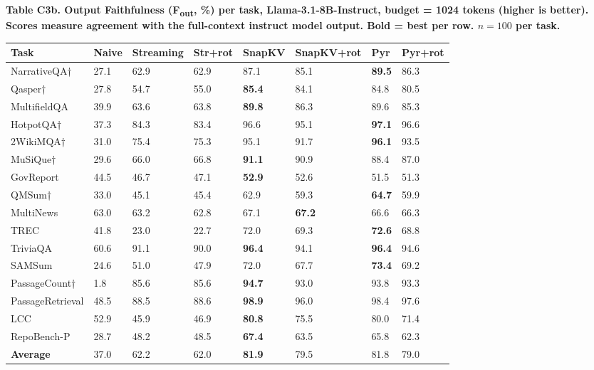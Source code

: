 \documentclass[10pt,letterpaper]{article}
\begin{document}
\textbf{Table C3b. Output Faithfulness (F\textsubscript{out}, \%) per task, Llama-3.1-8B-Instruct,
budget = 1024 tokens (higher is better). Scores measure agreement with the full-context
instruct model output. Bold = best per row. $n = 100$ per task.}

\begin{table}[H]
\centering
\small
\begin{tabular}{@{}llllllll@{}}
\toprule
Task & Naive & Streaming & Str+rot & SnapKV & SnapKV+rot & Pyr &
Pyr+rot\\
\midrule
NarrativeQA† & 27.1 & 62.9 & 62.9 & 87.1 & 85.1 & \textbf{89.5} &
86.3\\
Qasper† & 27.8 & 54.7 & 55.0 & \textbf{85.4} & 84.1 & 84.8 &
80.5\\
MultifieldQA & 39.9 & 63.6 & 63.8 & \textbf{89.8} & 86.3 & 89.6 &
85.3\\
HotpotQA† & 37.3 & 84.3 & 83.4 & 96.6 & 95.1 & \textbf{97.1} &
96.6\\
2WikiMQA† & 31.0 & 75.4 & 75.3 & 95.1 & 91.7 & \textbf{96.1} &
93.5\\
MuSiQue† & 29.6 & 66.0 & 66.8 & \textbf{91.1} & 90.9 & 88.4 &
87.0\\
GovReport & 44.5 & 46.7 & 47.1 & \textbf{52.9} & 52.6 & 51.5 &
51.3\\
QMSum† & 33.0 & 45.1 & 45.4 & 62.9 & 59.3 & \textbf{64.7} &
59.9\\
MultiNews & 63.0 & 63.2 & 62.8 & 67.1 & \textbf{67.2} & 66.6 &
66.3\\
TREC & 41.8 & 23.0 & 22.7 & 72.0 & 69.3 & \textbf{72.6} &
68.8\\
TriviaQA & 60.6 & 91.1 & 90.0 & \textbf{96.4} & 94.1 & \textbf{96.4} &
94.6\\
SAMSum & 24.6 & 51.0 & 47.9 & 72.0 & 67.7 & \textbf{73.4} &
69.2\\
PassageCount† & 1.8 & 85.6 & 85.6 & \textbf{94.7} & 93.0 & 93.8 &
93.3\\
PassageRetrieval & 48.5 & 88.5 & 88.6 & \textbf{98.9} & 96.0 & 98.4 &
97.6\\
LCC & 52.9 & 45.9 & 46.9 & \textbf{80.8} & 75.5 & 80.0 &
71.4\\
RepoBench-P & 28.7 & 48.2 & 48.5 & \textbf{67.4} & 63.5 & 65.8 &
62.3\\
\textbf{Average} & 37.0 & 62.2 & 62.0 & \textbf{81.9} & 79.5 & 81.8 &
79.0\\
\bottomrule
\end{tabular}
\end{table}
\end{document}
